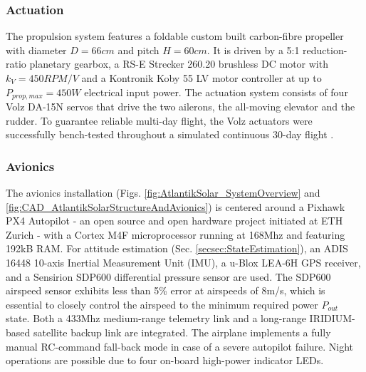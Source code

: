 \subsubsection{Actuation}
The propulsion system features a foldable custom built carbon-fibre propeller with diameter $D=66cm$ and pitch $H=60cm$. It is driven by a 5:1 reduction-ratio planetary gearbox, a RS-E Strecker 260.20 brushless DC motor with $k_V=450RPM/V$ and a Kontronik Koby 55 LV motor controller at up to $P_{prop,max}=450W$ electrical input power. The actuation system consists of four Volz DA-15N servos that drive the two ailerons, the all-moving elevator and the rudder. To guarantee reliable multi-day flight, the Volz actuators were successfully bench-tested throughout a simulated continuous 30-day flight \cite{DellaCa_BT}.

\subsubsection{Avionics}
The avionics installation (Figs. \ref{fig:AtlantikSolar_SystemOverview} and \ref{fig:CAD_AtlantikSolarStructureAndAvionics}) is centered around a Pixhawk PX4 Autopilot - an open source and open hardware project initiated at ETH Zurich - with a Cortex M4F microprocessor running at 168Mhz and featuring 192kB RAM. For attitude estimation (Sec. \ref{secsec:StateEstimation}), an ADIS 16448 10-axis Inertial Measurement Unit (IMU), a u-Blox LEA-6H GPS receiver, and a Sensirion SDP600 differential pressure sensor are used. The SDP600 airspeed sensor exhibits less than 5\% error at airspeeds of 8m/s, which is essential to closely control the airspeed to the minimum required power $P_{out}$ state. Both a 433Mhz medium-range telemetry link and a long-range IRIDIUM-based satellite backup link are integrated. The airplane implements a fully manual RC-command fall-back mode in case of a severe autopilot failure. Night operations are possible due to four on-board high-power indicator LEDs.


